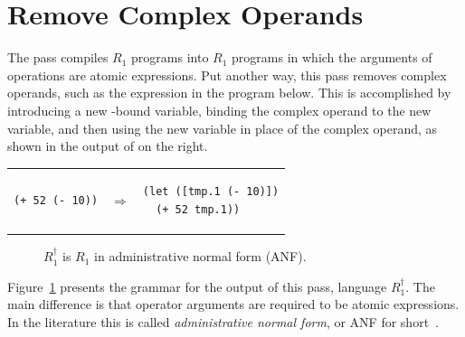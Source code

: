 \documentclass[11pt]{book}
\begin{document}
\section{Remove Complex Operands}
\label{sec:remove-complex-opera-R1}

The  pass compiles $R_1$ programs into
$R_1$ programs in which the arguments of operations are atomic
expressions.  Put another way, this pass removes complex operands,
such as the expression  in the program below. This is
accomplished by introducing a new -bound variable, binding
the complex operand to the new variable, and then using the new
variable in place of the complex operand, as shown in the output of
 on the right.\\
\begin{tabular}{lll}
\begin{minipage}{0.4\textwidth}
\begin{lstlisting}
(+ 52 (- 10))
\end{lstlisting}
\end{minipage}
&
$\Rightarrow$
&
\begin{minipage}{0.4\textwidth}
\begin{lstlisting}
(let ([tmp.1 (- 10)])
  (+ 52 tmp.1))
\end{lstlisting}
\end{minipage}
\end{tabular}


\begin{figure}[tp]
\centering
{}
\caption{$R_1^{\dagger}$ is $R_1$ in administrative normal form (ANF).}
\label{fig:r1-anf-syntax}
\end{figure}

Figure~\ref{fig:r1-anf-syntax} presents the grammar for the output of
this pass, language $R_1^{\dagger}$. The main difference is that
operator arguments are required to be atomic expressions.  In the
literature this is called \emph{administrative normal form}, or ANF
for short~\citep{Danvy:1991fk,Flanagan:1993cg}.
\end{document}
